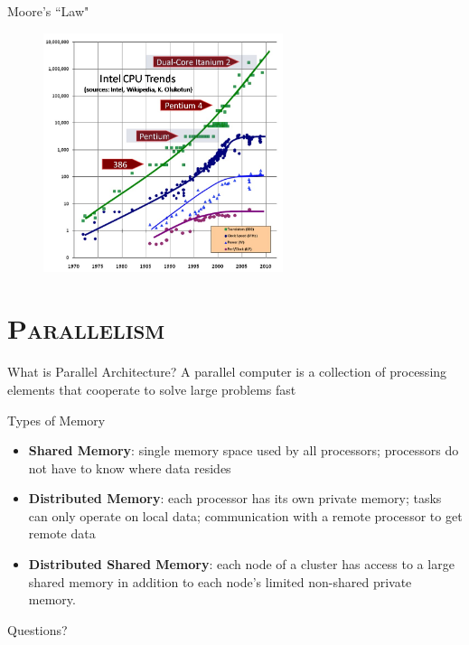 \documentclass[xcolor=x11names,compress]{beamer}
\renewcommand{\(}{\begin{columns}}
\renewcommand{\)}{\end{columns}}
\newcommand{\<}[1]{\begin{column}{#1}}
\renewcommand{\>}{\end{column}}
\begin{document}
\begin{frame}{Moore's ``Law"}

\begin{figure}
\includegraphics[height=2.75in,clip]{CPU-Scaling}
\end{figure}

\end{frame}

\section{\scshape Parallelism}
\begin{frame}{What is Parallel Architecture?}
A \textcolor{dgreen}{parallel computer} is a collection of processing elements that cooperate to solve large problems
fast

\end{frame}

\begin{frame}{Types of Memory}
\begin{itemize}
\item \textbf{Shared Memory}: single memory space used by all processors; processors do not have to know where data resides
\item \textbf{Distributed Memory}: each processor has its own private memory; tasks can only operate on local data; communication with a remote processor to get remote data
\item \textbf{Distributed Shared Memory}: each node of a cluster has access to a large shared memory in addition to each node's limited non-shared private memory.
\end{itemize}
\end{frame}



\begin{frame}{Questions?}
\begin{figure}
\end{figure}
\end{frame}
\end{document}
